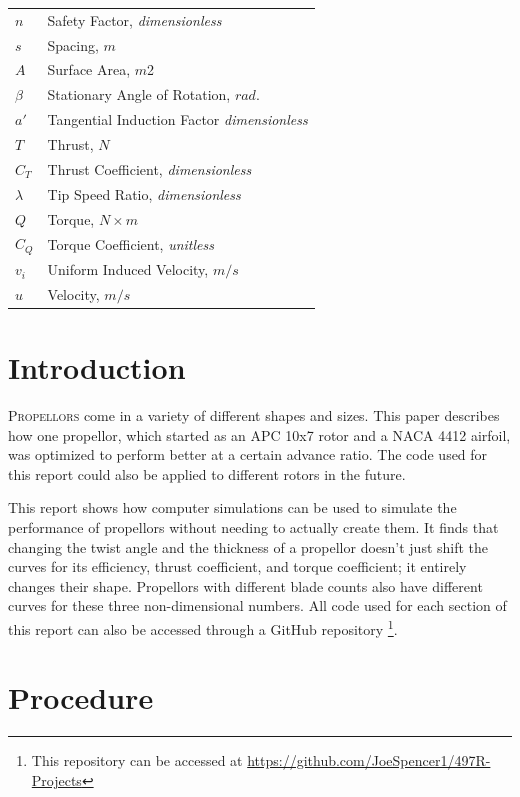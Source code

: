 \documentclass[journal ]{new-aiaa}
\begin{document}
{\begin{longtable*}{@{}l @{\quad=\quad} l@{}}
$n$ & Safety Factor, \emph{dimensionless} \\
$s$ & Spacing, $m$ \\
$A$ & Surface Area, $m${2} \\
$\beta$ & Stationary Angle of Rotation, $rad.$ \\
$a'$ & Tangential Induction Factor \emph{dimensionless} \\
$T$ & Thrust, $N$ \\
$C_{T}$ & Thrust Coefficient, \emph{dimensionless} \\
$\lambda$ & Tip Speed Ratio, \emph{dimensionless} \\
$Q$ & Torque, $N \times m$ \\
$C_{Q}$ & Torque Coefficient, \emph{unitless} \\
$v_{i}$ & Uniform Induced Velocity, $m/s$ \\
$u$ & Velocity, $m/s$ \\

\end{longtable*}}


\section{Introduction}

\lettrine{P}{ropellors} come in a variety of different shapes and sizes. This paper describes how one propellor, which started as an APC 10x7 rotor and a NACA 4412 airfoil, was optimized to perform better at a certain advance ratio. The code used for this report could also be applied to different rotors in the future.

This report shows how computer simulations can be used to simulate the performance of propellors without needing to actually create them. It finds that changing the twist angle and the thickness of a propellor doesn't just shift the curves for its efficiency, thrust coefficient, and torque coefficient; it entirely changes their shape. Propellors with different blade counts also have different curves for these three non-dimensional numbers. All code used for each section of this report can also be accessed through a GitHub repository \footnote{This repository can be accessed at \url{https://github.com/JoeSpencer1/497R-Projects}}.


\section{Procedure}
\end{document}
